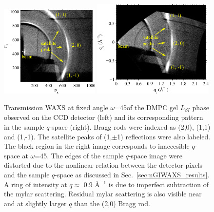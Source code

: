 \begin{figure}[htbp]
  \centering
  \includegraphics[width=0.44\textwidth]{figures/ripple/tWAXS/twaxs_gel_ccd}
  \includegraphics[width=0.54\textwidth]{figures/ripple/tWAXS/twaxs_gel_q}
  \caption[Transmission WAXS of the DMPC gel phase]
  {Transmission WAXS at fixed angle $\omega$=45\textdegree of the DMPC gel $L_{\beta I}$ phase observed on
  the CCD detector (left) and its corresponding pattern in the sample $q$-space
  (right). Bragg rods were indexed as (2,0), (1,1) and (1,-1). The satellite 
  peaks of (1,$\pm$1) reflections were also labeled. The black region in
  the right image corresponds to inaccesible $q$-space at $\omega$=45\textdegree. The edges
  of the sample $q$-space image were distorted due to the nonlinear relation
  between the detector pixels and the sample $q$-space as discussed in 
  Sec.~\ref{sec:nGIWAXS_results}. A ring of intensity
  at $q \approx$ 0.9 \AA$^{-1}$ is due to imperfect subtraction of the mylar
  scattering. Residual mylar scattering is also visible near and at slightly larger $q$ than the (2,0) Bragg 
  rod.}
  \label{fig:twaxs_gel}
\end{figure}

